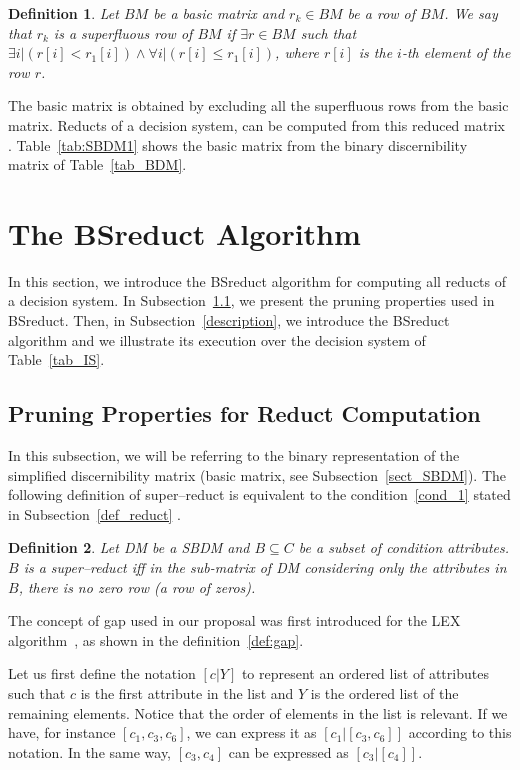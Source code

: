 \documentclass[number,preprint,review,12pt]{elsarticle}
\newtheorem{definition}{Definition}
\begin{document}
  \begin{definition}\label{def:basic_row}
	Let $BM$ be a basic matrix and $r_k \in BM$ be a row of $BM$. We say that $r_k$ is a superfluous row of $BM$ if $\exists r \in BM$ such that $\exists i | (r[i] < r_1[i]) \wedge \forall i | (r[i] \leq r_1[i])$, where $r[i]$ is the $i$-th element of the row $r$.
  \end{definition}

  The basic matrix is obtained by excluding all the superfluous rows from the basic matrix. Reducts of a decision system, can be computed from this reduced matrix \citep{Yao09}. Table~\ref{tab:SBDM1} shows the basic matrix from the binary discernibility matrix of Table~\ref{tab_BDM}.

  
\section{The BSreduct Algorithm}\label{BSreduct}
  In this section, we introduce the BSreduct algorithm for computing all reducts of a decision system. In  Subsection~\ref{properties}, we present the pruning properties used in BSreduct. Then, in Subsection~\ref{description}, we introduce the BSreduct algorithm and we illustrate its execution over the decision system of Table~\ref{tab_IS}.
  
\subsection{Pruning Properties for Reduct Computation}\label{properties}
	In this subsection, we will be referring to the binary representation of the simplified discernibility matrix (basic matrix, see Subsection~\ref{sect_SBDM}). The following definition of super--reduct is equivalent to the condition~\ref{cond_1} stated in Subsection~\ref{def_reduct} \citep{Lazo15}.
	
	\begin{definition}\label{def:testor}
		Let DM be a SBDM and $B \subseteq C$ be a subset of condition attributes. $B$ is a super--reduct iff in the sub-matrix of DM considering only the attributes in $B$, there is no zero row (a row of zeros).
	\end{definition}
	
	The concept of gap used in our proposal was first introduced for the LEX algorithm~\cite{Santiesteban03}, as shown in the definition~\ref{def:gap}.
	
	Let us first define the notation $[c|Y]$ to represent an ordered list of attributes such that $c$ is the first attribute in the list and $Y$ is the ordered list of the remaining elements. Notice that the order of elements in the list is relevant. If we have, for instance $[c_1,c_3,c_6]$, we can express it as $[c_1|[c_3,c_6]]$ according to this notation. In the same way, $[c_3,c_4]$ can be expressed as $[c_3|[c_4]]$.
	
\end{document}
